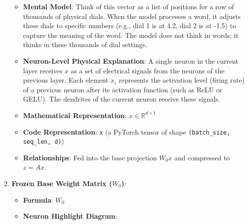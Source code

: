 \begin{enumerate}
\begin{itemize}
      \item \textbf{Mental Model}: Think of this vector as a list of positions for a row of thousands of physical dials. When the model processes a word, it adjusts these dials to specific numbers (e.g., dial 1 is at 4.2, dial 2 is at -1.5) to capture the meaning of the word. The model does not think in words; it thinks in these thousands of dial settings.
      \item \textbf{Neuron-Level Physical Explanation}: A single neuron in the current layer receives $x$ as a set of electrical signals from the neurons of the previous layer. Each element $x_i$ represents the activation level (firing rate) of a previous neuron after its activation function (such as ReLU or GELU). The dendrites of the current neuron receive these signals.
      \item \textbf{Mathematical Representation}: $x \in \mathbb{R}^{d \times 1}$
      \item \textbf{Code Representation}: \texttt{x} (a PyTorch tensor of shape \texttt{(batch\_size, seq\_len, d)})
      \item \textbf{Relationships}: Fed into the base projection $W_0 x$ and compressed to $z = Ax$.
    \end{itemize}

  \item \textbf{Frozen Base Weight Matrix ($W_0$)}:
    \begin{itemize}
      \item \textbf{Formula}: $W_0$
      \item \textbf{Neuron Highlight Diagram}:

\begin{center}
\begin{adjustbox}{max width=0.85\linewidth}
\end{adjustbox}
\end{center}
\end{itemize}
\end{enumerate}
